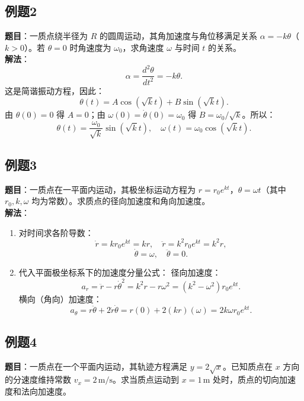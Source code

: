 \subsection{例题2}
\textbf{题目}：一质点绕半径为 $R$ 的圆周运动，其角加速度与角位移满足关系 $\alpha = -k\theta$（$k>0$）。若 $\theta=0$ 时角速度为 $\omega_0$，求角速度 $\omega$ 与时间 $t$ 的关系。\\

\textbf{解法}：
\[
    \alpha=\frac{d^2\theta}{dt^2}=-k\theta.
\]
这是简谐振动方程，因此：
\[
    \theta(t)=A\cos(\sqrt{k}t)+B\sin(\sqrt{k}t).
\]
由 $\theta(0)=0$ 得 $A=0$；由 $\omega(0)=\dot\theta(0)=\omega_0$ 得 $B=\omega_0/\sqrt{k}$。所以：
\[
    \theta(t)=\frac{\omega_0}{\sqrt{k}}\sin(\sqrt{k}t), \quad \omega(t)=\omega_0\cos(\sqrt{k}t).
\]

\subsection{例题3}
\textbf{题目}：一质点在一平面内运动，其极坐标运动方程为 $r = r_0 e^{kt}$，$\theta = \omega t$（其中 $r_0, k, \omega$ 均为常数）。求质点的径向加速度和角向加速度。\\

\textbf{解法}：
\begin{enumerate}
    \item 对时间求各阶导数：
          \[
              \dot{r} = k r_0 e^{kt} = kr,\quad \ddot{r} = k^2 r_0 e^{kt} = k^2 r,
          \]
          \[
              \dot{\theta} = \omega,\quad \ddot{\theta} = 0.
          \]
    \item 代入平面极坐标系下的加速度分量公式：
          径向加速度：
          \[
              a_r = \ddot{r} - r\dot{\theta}^2 = k^2 r - r\omega^2 = (k^2 - \omega^2)r_0 e^{kt}.
          \]
          横向（角向）加速度：
          \[
              a_\theta = r\ddot{\theta} + 2\dot{r}\dot{\theta} = r(0) + 2(kr)(\omega) = 2k\omega r_0 e^{kt}.
          \]
\end{enumerate}

\subsection{例题4}
\textbf{题目}：一质点在一个平面内运动，其轨迹方程满足 $y = 2\sqrt{x}$。已知质点在 $x$ 方向的分速度维持常数 $v_x = 2\,\text{m/s}$。求当质点运动到 $x = 1\,\text{m}$ 处时，质点的切向加速度和法向加速度。\\

